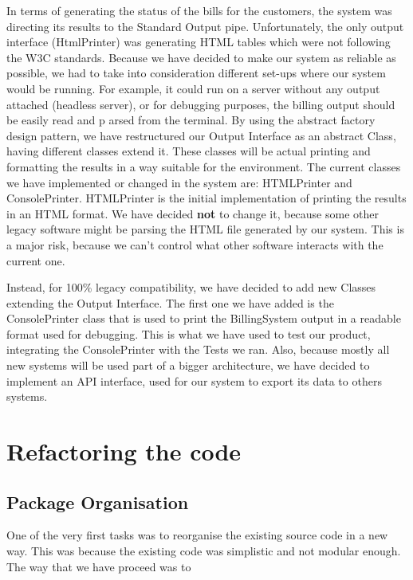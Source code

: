 \documentclass[11pt,twocolumn]{article} %
\begin{document}
In terms of generating the status of the bills for the customers, the system was directing its results to the Standard Output pipe. 
Unfortunately, the only output interface (HtmlPrinter) was generating HTML tables which were not following the W3C standards. 
Because we have decided to make our system as reliable as possible, we had to take into consideration different set-ups where our system would be running. 
For example, it could run on a server without any output attached (headless server), or for debugging purposes, 
the billing output should be easily read and p arsed from the terminal. 
By using the abstract factory design pattern, we have restructured our Output Interface as an abstract Class, 
having different classes extend it. These classes will be actual printing and formatting the results in a way suitable for the environment.
The current classes we have implemented or changed in the system are: HTMLPrinter and ConsolePrinter. HTMLPrinter is the initial implementation 
of printing the results in an HTML format. We have decided \textbf{not} to change it, because some other legacy software might be parsing the
HTML file generated by our system. This is a major risk, because we can't control what other software interacts with the current one.

Instead, for 100\% legacy compatibility, we have decided to add new Classes extending the Output Interface. 
The first one we have added is the ConsolePrinter class that is used to print the BillingSystem output in a readable format used for debugging.
This is what we have used to test our product, integrating the ConsolePrinter with the Tests we ran. Also, because mostly all new systems will be used 
part of a bigger architecture, we have decided to implement an API interface, used for our system to export its data to others systems. 





\section{Refactoring the code}

\subsection{Package Organisation}
One of the very first tasks was to reorganise the existing source code in a new way.
This was because the existing code was simplistic and not modular enough. The way that
we have proceed was to 
\end{document}
